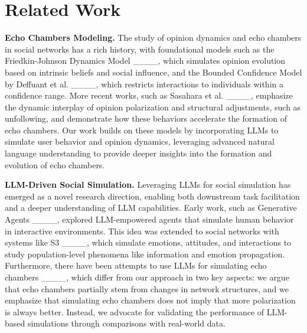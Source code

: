 \section{Related Work}
\textbf{Echo Chambers Modeling.} The study of opinion dynamics and echo chambers in social networks has a rich history, with foundational models such as the Friedkin-Johnson Dynamics Model ____, which simulates opinion evolution based on intrinsic beliefs and social influence, and the Bounded Confidence Model by Deffuant et al. ____, which restricts interactions to individuals within a confidence range. More recent works, such as Sasahara et al. ____, emphasize the dynamic interplay of opinion polarization and structural adjustments, such as unfollowing, and demonstrate how these behaviors accelerate the formation of echo chambers. Our work builds on these models by incorporating LLMs to simulate user behavior and opinion dynamics, leveraging advanced natural language understanding to provide deeper insights into the formation and evolution of echo chambers.

\textbf{LLM-Driven Social Simulation.} Leveraging LLMs for social simulation has emerged as a novel research direction, enabling both downstream task facilitation and a deeper understanding of LLM capabilities. Early work, such as Generative Agents ____, explored LLM-empowered agents that simulate human behavior in interactive environments. This idea was extended to social networks with systems like S3 ____, which simulate emotions, attitudes, and interactions to study population-level phenomena like information and emotion propagation. Furthermore, there have been attempts to use LLMs for simulating echo chambers ____, which differ from our approach in two key aspects: we argue that echo chambers partially stem from changes in network structures, and we emphasize that simulating echo chambers does not imply that more polarization is always better. Instead, we advocate for validating the performance of LLM-based simulations through comparisons with real-world data. %
